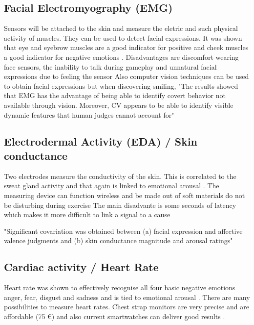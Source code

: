 \subsection{Facial Electromyography (EMG)}
Sensors will be attached to the skin and measure the eletric and such physical activity of muscles. They can be used to detect facial expressions. It was shown that eye \cite{ravaja2018phasic} and eyebrow muscles are a good indicator for positive and cheek muscles a good indicator for negative emotions \cite{nacke2015physiological,mandryk2006using}. 
Disadvantages are discomfort wearing face sensors, the inability to talk during gameplay and unnatural facial expressions due to feeling the sensor \cite{nacke2015physiological}
Also computer vision techniques can be used to obtain facial expressions but when discovering smiling, "The results showed that EMG has the advantage of
being able to identify covert behavior not available through
vision. Moreover, CV appears to be able to identify visible
dynamic features that human judges cannot account for" \cite{hernandez19invisible}

\subsection{Electrodermal Activity (EDA) / Skin conductance}
Two electrodes measure the conductivity of the skin. This is correlated to the sweat gland activity and that again is linked to emotional arousal \cite{nacke2015physiological, dawson2000electrodermal}. The measuring device can function wireless and be made out of soft materials \cite{kim2021soft} do not be disturbing during exercise 
The main disadvante is some seconds of latency which makes it more difficult to link a signal to a cause \cite{nacke2015physiological} 

"Significant covariation was obtained between (a) facial expression and affective valence judgments and (b) skin conductance magnitude and arousal ratings" \cite{lang93pictures}

\subsection{Cardiac activity / Heart Rate}
Heart rate was shown to effectively recognise all four basic negative emotions anger, fear, disgust and sadness \cite{levenson2003blood} and is tied to emotional arousal \cite{nacke2015physiological}. There are many possibilities to measure heart rates. Chest strap monitors are very precise and are affordable (75 €) \cite{link_herzfrequenzsensor} and also current smartwatches can deliver good results \cite{gilinov2017variable}.

